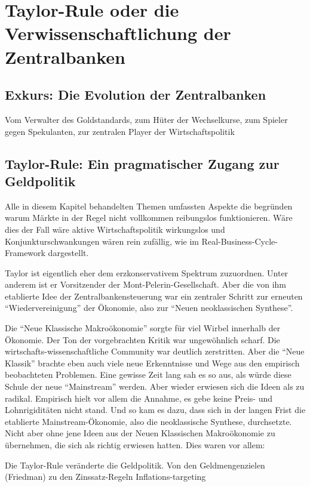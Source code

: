 \section{Taylor-Rule oder die Verwissenschaftlichung der Zentralbanken}
\label{Taylor-Rule}

\subsection{Exkurs: Die Evolution der Zentralbanken}
Vom Verwalter des Goldstandards, zum Hüter der Wechselkurse, zum Spieler gegen Spekulanten, zur zentralen Player der Wirtschaftspolitik

\subsection{Taylor-Rule: Ein pragmatischer Zugang zur Geldpolitik}
Alle  in diesem Kapitel behandelten Themen umfassten Aspekte die begründen warum Märkte in der Regel nicht vollkommen reibungslos funktionieren. Wäre dies der Fall wäre aktive Wirtschaftspolitik wirkungslos und Konjunkturschwankungen wären rein zufällig, wie im Real-Business-Cycle-Framework dargestellt.
\textcite[S. 823]{Akerlof1985}

Taylor ist eigentlich eher dem erzkonservativem Spektrum zuzuordnen. Unter anderem ist er Vorsitzender der Mont-Pelerin-Gesellschaft. Aber die von ihm etablierte Idee der Zentralbankensteuerung war ein zentraler Schritt zur erneuten "`Wiedervereinigung"' der Ökonomie, also zur "`Neuen neoklassischen Synthese"'.

Die "`Neue Klassische Makroökonomie"' sorgte für viel Wirbel innerhalb der Ökonomie. Der Ton der vorgebrachten Kritik war ungewöhnlich scharf. Die wirtschafts-wissenschaftliche Community war deutlich zerstritten. Aber die "`Neue Klassik"' brachte eben auch viele neue Erkenntnisse und Wege aus den empirisch beobachteten Problemen. Eine gewisse Zeit lang sah es so aus, als würde diese Schule der neue "`Mainstream"' werden. Aber wieder erwiesen sich die Ideen als zu radikal. Empirisch hielt vor allem die Annahme, es gebe keine Preis- und Lohnrigiditäten nicht stand.
Und so kam es dazu, dass sich in der langen Frist die etablierte Mainstream-Ökonomie, also die neoklassische Synthese, durchsetzte. Nicht aber ohne jene Ideen aus der Neuen Klassischen Makroökonomie zu übernehmen, die sich als richtig erwiesen hatten. Dies waren vor allem:

Die Taylor-Rule veränderte die Geldpolitik. Von den Geldmengenzielen (Friedman) zu den Zinssatz-Regeln \parencite[S. 36]{Gali2007} Inflations-targeting


